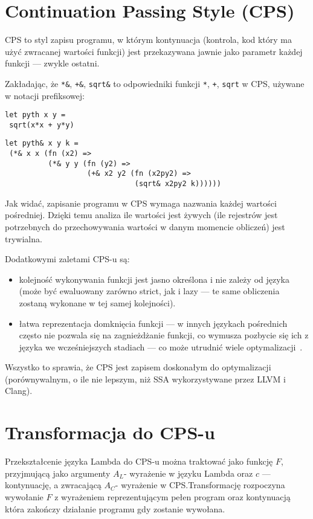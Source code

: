 \documentclass[11pt]{scrartcl}
\begin{document}
\section{Continuation Passing Style (CPS)}
CPS to styl zapisu programu, w którym kontynuacja (kontrola, kod który ma użyć
zwracanej wartości funkcji) jest przekazywana jawnie jako parametr każdej
funkcji --- zwykle ostatni.

Zakładając, że \lstinline|*&|, \lstinline|+&|, \lstinline|sqrt&| to  odpowiedniki funkcji \lstinline|*|, \lstinline|+|, \lstinline|sqrt|  w CPS, używane
w notacji prefiksowej:
\begin{lstlisting}[caption=Typowy Program]
let pyth x y =
 sqrt(x*x + y*y)
\end{lstlisting}
\begin{lstlisting}[caption=Ten sam program w CPS]
let pyth& x y k =
 (*& x x (fn (x2) =>
          (*& y y (fn (y2) =>
                   (+& x2 y2 (fn (x2py2) =>
                              (sqrt& x2py2 k))))))

\end{lstlisting}


Jak widać, zapisanie programu w CPS wymaga nazwania każdej wartości pośredniej.
Dzięki temu analiza ile wartości jest żywych (ile rejestrów jest potrzebnych do
przechowywania wartości w danym momencie obliczeń) jest trywialna.


Dodatkowymi zaletami CPS-u są:
\begin{itemize}
\item kolejność wykonywania funkcji jest jasno określona i nie zależy od
  języka (może być ewaluowany zarówno strict, jak i lazy --- te same obliczenia
  zostaną wykonane w tej samej kolejności).
\item łatwa reprezentacja domknięcia funkcji --- w innych językach pośrednich
  często nie pozwala się na zagnieżdżanie funkcji, co wymusza pozbycie się ich z
  języka we wcześniejszych stadiach --- co może utrudnić wiele
  optymalizacji~\cite{Appel1.2}.
\end{itemize}
Wszystko to sprawia, że CPS jest zapisem doskonałym do optymalizacji
(porównywalnym, o ile nie lepszym, niż SSA wykorzystywane przez LLVM i Clang).



\section{Transformacja do CPS-u}
Przekształcenie języka Lambda do CPS-u można traktować jako funkcję $F$,
przyjmującą jako argumenty $A_L$- wyrażenie w języku Lambda oraz $c$ --- kontynuację, a
zwracającą $A_C$- wyrażenie w CPS.\@ Transformację rozpoczyna wywołanie $F$ z
wyrażeniem reprezentującym pełen program oraz kontynuacją która zakończy
działanie programu gdy zostanie wywołana.
\end{document}
